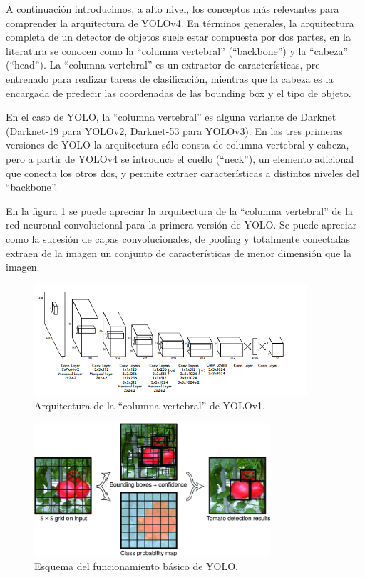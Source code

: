 A continuación introducimos, a alto nivel, los conceptos más relevantes para comprender la arquitectura de YOLOv4.  En términos generales, la arquitectura completa de un detector de objetos suele estar compuesta por dos partes, en la literatura se conocen como la ``columna vertebral'' (``backbone'') y la ``cabeza'' (``head''). La ``columna vertebral'' es un extractor de características, pre-entrenado para realizar tareas de clasificación, mientras que la cabeza es la encargada de predecir las coordenadas de las bounding box y el tipo de objeto. 

En el caso de YOLO, la ``columna vertebral'' es alguna variante de Darknet (Darknet-19 para YOLOv2, Darknet-53 para YOLOv3). En las tres primeras versiones de YOLO la arquitectura sólo consta de columna vertebral y cabeza, pero a partir de YOLOv4 se introduce el cuello (``neck''), un elemento adicional que conecta los otros dos, y permite extraer características a distintos niveles del ``backbone''.

En la figura \ref{fig:yoloconvolutionlayers} se puede apreciar la arquitectura de la ``columna vertebral'' de la red neuronal convolucional para la primera versión de YOLO. Se puede apreciar como la sucesión de capas convolucionales, de pooling y totalmente conectadas extraen de la imagen un conjunto de características de menor dimensión que la imagen.

\begin{figure}[]
    \centering
    \includegraphics[width=0.9\textwidth,height=0.9\textheight,keepaspectratio]{imagenes/parte_IA/YOLOv1-architecture.png}    
    \caption{Arquitectura de la ``columna vertebral'' de YOLOv1.}
    \label{fig:yoloconvolutionlayers}
\end{figure}

\begin{figure}[]
    \centering
    \includegraphics[width=0.78\textwidth,height=0.78\textheight,keepaspectratio]{imagenes/parte_IA/YOLO-simplify-steps.png}    
    \caption{Esquema del funcionamiento básico de YOLO.}
    \label{fig:yolosimplify}
\end{figure}

